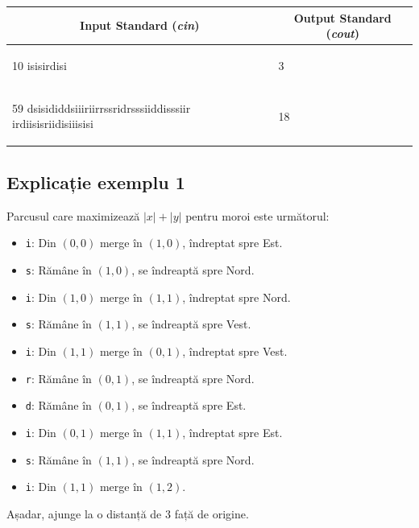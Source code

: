 \documentclass[12pt,a4paper]{article}
\begin{document}
\begin{tabular}{|@{}p{}@{}|@{}p{}@{}|}
\hline
\multicolumn{1}{|c|}{\bfseries Input Standard (\textit{cin})} &
\multicolumn{1}{c|}{\bfseries Output Standard (\textit{cout})} \\
\hline
\begin{textQuoteCell}
10
isisirdisi
\end{textQuoteCell} &
\begin{textQuoteCell}
3
\end{textQuoteCell} \\    
\hline
\begin{textQuoteCell}
59
dsisididdsiiiriirrssridrsssiiddisssiir
irdiisisriidisiiisisi
\end{textQuoteCell} &
\begin{textQuoteCell}
18
\end{textQuoteCell} \\    
\hline
\end{tabular}
\vspace{1em}

\subsection*{Explicație exemplu 1}

Parcusul care maximizează $|x| + |y|$ pentru moroi este următorul:

\begin{itemize}
    \item \texttt{i}: Din $(0, 0)$ merge în $(1, 0)$, îndreptat spre Est.
    \item \texttt{s}: Rămâne în $(1, 0)$, se îndreaptă spre Nord.
    \item \texttt{i}: Din $(1, 0)$ merge în $(1, 1)$, îndreptat spre Nord.
    \item \texttt{s}: Rămâne în $(1, 1)$, se îndreaptă spre Vest.
    \item \texttt{i}: Din $(1, 1)$ merge în $(0, 1)$, îndreptat spre Vest.
    \item \texttt{r}: Rămâne în $(0, 1)$, se îndreaptă spre Nord.
    \item \texttt{d}: Rămâne în $(0, 1)$, se îndreaptă spre Est.
    \item \texttt{i}: Din $(0, 1)$ merge în $(1, 1)$, îndreptat spre Est.
    \item \texttt{s}: Rămâne în $(1, 1)$, se îndreaptă spre Nord.
    \item \texttt{i}: Din $(1, 1)$ merge în $(1, 2)$.
\end{itemize}

Așadar, ajunge la o distanță de 3 față de origine.
\end{document}
